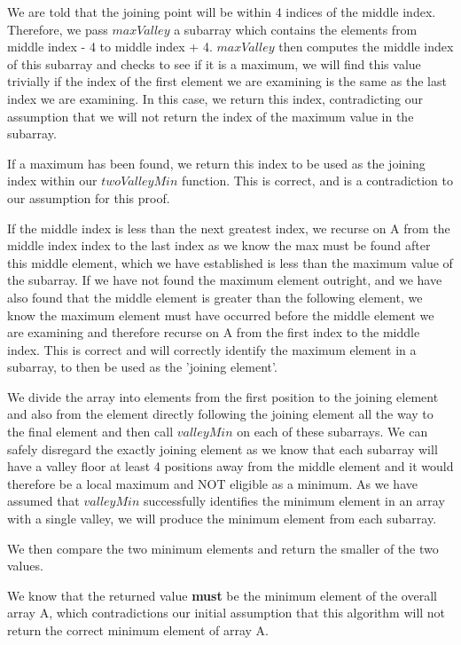 \documentclass[12pt]{article}
\begin{document}
\begin{enumerate}
\begin{enumerate}
    We are told that the joining point will be within 4 indices of the middle index. Therefore, we pass $maxValley$ a subarray which contains the elements from middle index - 4 to middle index + 4. $maxValley$  then computes the middle index of this subarray and checks to see if it is a maximum, we will find this value trivially if the index of the first element we are examining is the same as the last index we are examining. In this case, we return this index, contradicting our assumption that we will not return the index of the maximum value in the subarray. 
    
    If a maximum has been found, we return this index to be used as the joining index within our $twoValleyMin$ function. This is correct, and is a contradiction to our assumption for this proof. 
    
    If the middle index is less than the next greatest index, we recurse on A from the middle index index to the last index as we know the max must be found after this middle element, which we have established is less than the maximum value of the subarray. If we have not found the maximum element outright, and we have also found that the middle element is greater than the following element, we know the maximum element must have occurred before the middle element we are examining and therefore recurse on A from the first index to the middle index. This is correct and will correctly identify the maximum element in a subarray, to then be used as the 'joining element'.
    
    
    We divide the array into elements from the first position to the joining element and also from the element directly following the joining element all the way to the final element and then call $valleyMin$ on each of these subarrays. We can safely disregard the exactly joining element as we know that each subarray will have a valley floor at least 4 positions away from the middle element and it would therefore be a local maximum and NOT eligible as a minimum. As we have assumed that $valleyMin$ successfully identifies the minimum element in an array with a single valley, we will produce the minimum element from each subarray.
    
    We then compare the two minimum elements and return the smaller of the two values. 
    
    We know that the returned value \textbf{must} be the minimum element of the overall array A, which contradictions our initial assumption that this algorithm will not return the correct minimum element of array A.
    

\end{enumerate}
\end{enumerate}
\end{document}
